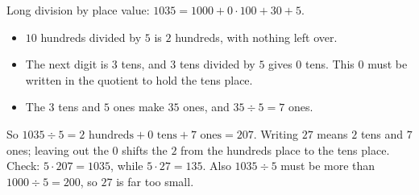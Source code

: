Long division by place value: $1035=1000+0\cdot100+30+5$.
\begin{itemize}
\item $10$ hundreds divided by $5$ is $2$ hundreds, with nothing left over.
\item The next digit is $3$ tens, and $3$ tens divided by $5$ gives $0$ tens. This $0$ must be written in the quotient to hold the tens place.
\item The $3$ tens and $5$ ones make $35$ ones, and $35\div5=7$ ones.
\end{itemize}
So $1035\div5=2\text{ hundreds}+0\text{ tens}+7\text{ ones}=\boxed{207}$. Writing $27$ means $2$ tens and $7$ ones; leaving out the $0$ shifts the $2$ from the hundreds place to the tens place. Check: $5\cdot207=1035$, while $5\cdot27=135$. Also $1035\div5$ must be more than $1000\div5=200$, so $27$ is far too small.
